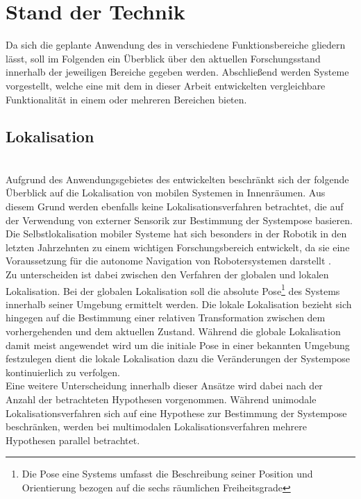 \chapter{Stand der Technik}
\label{chap:tech}
Da sich die geplante Anwendung des  in verschiedene Funktionsbereiche gliedern lässt, soll im Folgenden ein Überblick über den aktuellen Forschungsstand innerhalb der jeweiligen Bereiche gegeben werden. Abschließend werden Systeme vorgestellt, welche eine mit dem in dieser Arbeit entwickelten \kps{} vergleichbare Funktionalität in einem oder mehreren Bereichen bieten.

\section{Lokalisation}
\label{chap:mcl}
\\
Aufgrund des Anwendungsgebietes des entwickelten  beschränkt sich der folgende Überblick auf die Lokalisation von mobilen Systemen in Innenräumen. Aus diesem Grund werden ebenfalls keine Lokalisationsverfahren betrachtet, die auf der Verwendung von externer Sensorik zur Bestimmung der Systempose basieren.\\
Die Selbstlokalisation mobiler Systeme hat sich besonders in der Robotik in den letzten Jahrzehnten zu einem wichtigen Forschungsbereich entwickelt, da sie eine Voraussetzung für die autonome Navigation von Robotersystemen darstellt .\\
Zu unterscheiden ist dabei zwischen den Verfahren der globalen und lokalen Lokalisation. Bei der globalen Lokalisation soll die absolute Pose\footnote{Die Pose eine Systems umfasst die Beschreibung seiner Position und Orientierung bezogen auf die sechs räumlichen Freiheitsgrade } des Systems innerhalb seiner Umgebung ermittelt werden. Die lokale Lokalisation bezieht sich hingegen auf die Bestimmung einer relativen Transformation zwischen dem vorhergehenden und dem aktuellen Zustand. Während die globale Lokalisation damit meist angewendet wird um die initiale Pose in einer bekannten Umgebung festzulegen dient die lokale Lokalisation dazu die Veränderungen der Systempose kontinuierlich zu verfolgen.\\ 
Eine weitere Unterscheidung innerhalb dieser Ansätze wird dabei nach der Anzahl der betrachteten Hypothesen vorgenommen. Während unimodale Lokalisationsverfahren sich auf eine Hypothese zur Bestimmung der Systempose beschränken, werden bei multimodalen Lokalisationsverfahren mehrere Hypothesen parallel betrachtet.
